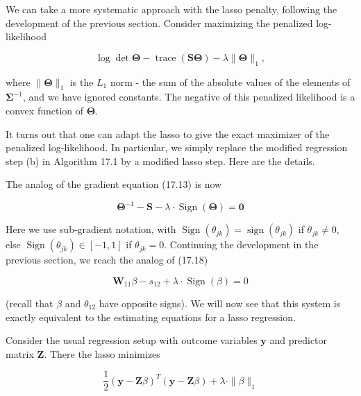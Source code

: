 \documentclass[10pt]{article}
\begin{document}
We can take a more systematic approach with the lasso penalty, following the development of the previous section. Consider maximizing the penalized log-likelihood


\begin{equation*}
\log \operatorname{det} \boldsymbol{\Theta}-\operatorname{trace}(\mathbf{S} \boldsymbol{\Theta})-\lambda\|\boldsymbol{\Theta}\|_{1}, \tag{17.21}
\end{equation*}


where $\|\mathbf{\Theta}\|_{1}$ is the $L_{1}$ norm - the sum of the absolute values of the elements of $\boldsymbol{\Sigma}^{-1}$, and we have ignored constants. The negative of this penalized likelihood is a convex function of $\boldsymbol{\Theta}$.

It turns out that one can adapt the lasso to give the exact maximizer of the penalized log-likelihood. In particular, we simply replace the modified regression step (b) in Algorithm 17.1 by a modified lasso step. Here are the details.

The analog of the gradient equation (17.13) is now


\begin{equation*}
\boldsymbol{\Theta}^{-1}-\mathbf{S}-\lambda \cdot \operatorname{Sign}(\boldsymbol{\Theta})=\mathbf{0} \tag{17.22}
\end{equation*}


Here we use sub-gradient notation, with $\operatorname{Sign}\left(\theta_{j k}\right)=\operatorname{sign}\left(\theta_{j k}\right)$ if $\theta_{j k} \neq 0$, else $\operatorname{Sign}\left(\theta_{j k}\right) \in[-1,1]$ if $\theta_{j k}=0$. Continuing the development in the previous section, we reach the analog of (17.18)


\begin{equation*}
\mathbf{W}_{11} \beta-s_{12}+\lambda \cdot \operatorname{Sign}(\beta)=0 \tag{17.23}
\end{equation*}


(recall that $\beta$ and $\theta_{12}$ have opposite signs). We will now see that this system is exactly equivalent to the estimating equations for a lasso regression.

Consider the usual regression setup with outcome variables $\mathbf{y}$ and predictor matrix $\mathbf{Z}$. There the lasso minimizes


\begin{equation*}
\frac{1}{2}(\mathbf{y}-\mathbf{Z} \beta)^{T}(\mathbf{y}-\mathbf{Z} \beta)+\lambda \cdot\|\beta\|_{1} \tag{17.24}
\end{equation*}
\end{document}

